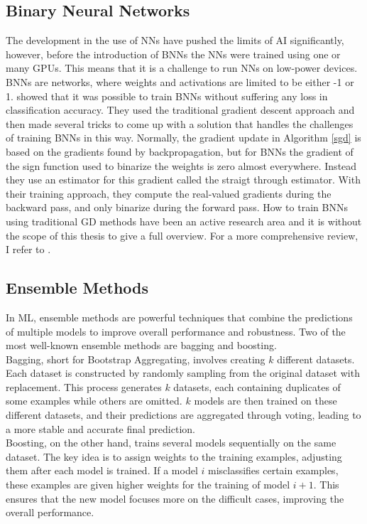 \subsection{Binary Neural Networks}
The development in the use of NNs have pushed the limits of AI significantly, however, before the introduction of BNNs the NNs were trained using one or many GPUs. This means that it is a challenge to run NNs on low-power devices. BNNs are networks, where weights and activations are limited to be either -1 or 1. \cite{Hubara2016} showed that it was possible to train BNNs without suffering any loss in classification accuracy. They used the traditional gradient descent approach and then made several tricks to come up with a solution that handles the challenges of training BNNs in this way. Normally, the gradient update in Algorithm \ref{sgd} is based on the gradients found by backpropagation, but for BNNs the gradient of the sign function used to binarize the weights is zero almost everywhere. Instead they use an estimator for this gradient called the straigt through estimator. With their training approach, they compute the real-valued gradients during the backward pass, and only binarize during the forward pass. How to train BNNs using traditional GD methods have been an active research area and it is without the scope of this thesis to give a full overview. For a more comprehensive review, I refer to \cite{yuan2023}. 

\subsection{Ensemble Methods}
In ML, ensemble methods are powerful techniques that combine the predictions of multiple models to improve overall performance and robustness. Two of the most well-known ensemble methods are bagging and boosting. \\

\noindent Bagging, short for Bootstrap Aggregating, involves creating $k$ different datasets. Each dataset is constructed by randomly sampling from the original dataset with replacement. This process generates $k$ datasets, each containing duplicates of some examples while others are omitted. $k$ models are then trained on these different datasets, and their predictions are aggregated through voting, leading to a more stable and accurate final prediction. \\

\noindent Boosting, on the other hand, trains several models sequentially on the same dataset. The key idea is to assign weights to the training examples, adjusting them after each model is trained. If a model $i$ misclassifies certain examples, these examples are given higher weights for the training of model $i+1$. This ensures that the new model focuses more on the difficult cases, improving the overall performance. \\

